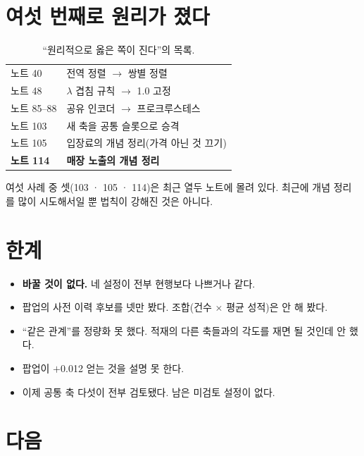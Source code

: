 \documentclass[10pt]{article}
\begin{document}
\section{여섯 번째로 원리가 졌다}

\begin{table}[t]
\centering\tsize
\caption{``원리적으로 옳은 쪽이 진다''의 목록.}
\begin{tabular}{ll}
\toprule
노트 40 & 전역 정렬 $\to$ 쌍별 정렬 \\
노트 48 & $\lambda$ 겹침 규칙 $\to$ 1.0 고정 \\
노트 85--88 & 공유 인코더 $\to$ 프로크루스테스 \\
노트 103 & 새 축을 공통 슬롯으로 승격 \\
노트 105 & 입장료의 개념 정리(가격 아닌 것 끄기) \\
\textbf{노트 114} & \textbf{매장 노출의 개념 정리} \\
\bottomrule
\end{tabular}
\end{table}

{여섯 사례 중 셋(103 · 105 · 114)은 최근 열두 노트에 몰려 있다. 최근에
개념 정리를 많이 시도해서일 뿐 법칙이 강해진 것은 아니다.}

\section{한계}

\begin{itemize}[leftmargin=1.1em,itemsep=0.15em]
\item \textbf{바꿀 것이 없다.} 네 설정이 전부 현행보다 나쁘거나 같다.
\item 팝업의 사전 이력 후보를 넷만 봤다. 조합(건수 $\times$ 평균 성적)은
      안 해 봤다.
\item ``같은 관계''를 정량화 못 했다. 적재의 다른 축들과의 각도를 재면
      될 것인데 안 했다.
\item 팝업이 $+$0.012 얻는 것을 설명 못 한다.
\item 이제 공통 축 다섯이 전부 검토됐다. 남은 미검토 설정이 없다.
\end{itemize}

\section{다음}
\end{document}
